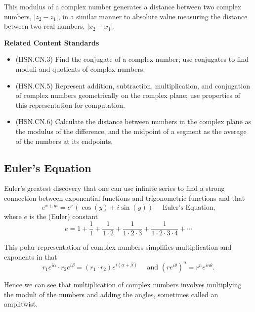 \documentclass[
]{book}
\providecommand{\tightlist}{%
  \setlength{\itemsep}{0pt}\setlength{\parskip}{0pt}}
\newenvironment{standards}{}{}
\theoremstyle{definition}
\theoremstyle{definition}
\theoremstyle{definition}
\theoremstyle{definition}
\theoremstyle{remark}
\begin{document}
This modulus of a complex number generates a distance between two complex numbers, \(|z_2-z_1|\), in a similar manner to absolute value measuring the distance between two real numbers, \(|x_2-x_1|\).

\begin{standards}

\begin{center}
\textbf{Related Content Standards}

\end{center}

\begin{itemize}
\tightlist
\item
  (HSN.CN.3) Find the conjugate of a complex number; use conjugates to find moduli and quotients of complex numbers.
\item
  (HSN.CN.5) Represent addition, subtraction, multiplication, and conjugation of complex numbers geometrically on the complex plane; use properties of this representation for computation.
\item
  (HSN.CN.6) Calculate the distance between numbers in the complex plane as the modulus of the difference, and the midpoint of a segment as the average of the numbers at its endpoints.
\end{itemize}

\end{standards}

\hypertarget{eulers-equation}{%
\subsection{Euler's Equation}\label{eulers-equation}}

Euler's \citeyearpar{Euler} greatest discovery that one can use infinite series to find a strong connection between exponential functions and trigonometric functions and that
\[e^{x+yi} = e^x \left( \cos(y) + i \sin(y)\right) \quad \mbox{ Euler's Equation,}\] where \(e\) is the (Euler) constant \[e= 1 + \frac{1}{1} + \frac{1}{1\cdot 2} + \frac{1}{1\cdot 2 \cdot 3} + \frac{1}{1\cdot 2\cdot 3\cdot 4} + \cdots\]

This polar representation of complex numbers simplifies multiplication and exponents in that
\[r_1 e^{i\alpha} \cdot r_2 e^{i\beta} = (r_1\cdot r_2) e^{i(\alpha+\beta)} \quad \mbox{ and } \left(r e^{i\theta}\right)^n = r^n e^{in\theta}.\]

Hence we can see that multiplication of complex numbers involves multiplying the moduli of the numbers and adding the angles, sometimes called an amplitwist.
\end{document}

